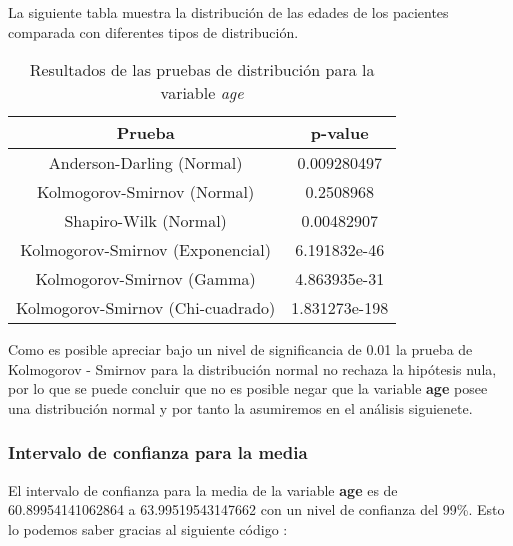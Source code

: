 \documentclass[a4paper,12pt]{article}
\begin{document}
    La siguiente tabla muestra la distribución de las edades de los pacientes comparada con diferentes tipos de distribución.

\begin{table}[h!]
    \centering
    \begin{tabular}{|c|c|}
        \hline
        \textbf{Prueba} & \textbf{p-value} \\
        \hline
        Anderson-Darling (Normal) & 0.009280497 \\
        \hline
        Kolmogorov-Smirnov (Normal) & 0.2508968 \\
        \hline
        Shapiro-Wilk (Normal) & 0.00482907 \\
        \hline
        Kolmogorov-Smirnov (Exponencial) & 6.191832e-46 \\
        \hline
        Kolmogorov-Smirnov (Gamma) & 4.863935e-31 \\
        \hline
        Kolmogorov-Smirnov (Chi-cuadrado) & 1.831273e-198 \\
        \hline
    \end{tabular}
    \caption{Resultados de las pruebas de distribución para la variable \textit{age}}
    \label{tab:pruebas_distribucion_age}
\end{table}

    Como es posible apreciar bajo un nivel de significancia de 0.01 la prueba de Kolmogorov - Smirnov para la distribución normal no rechaza la hipótesis nula, por lo que se puede concluir que no es posible negar que la variable \textbf{age} posee una distribución normal y por tanto la  asumiremos en el análisis siguienete.
    
    \subsubsection*{Intervalo de confianza para la media}

    El intervalo de confianza para la media de la variable \textbf{age} es de 60.89954141062864 a 63.99519543147662 con un nivel de confianza del 99\%. Esto lo podemos saber gracias al siguiente código :
\end{document}
